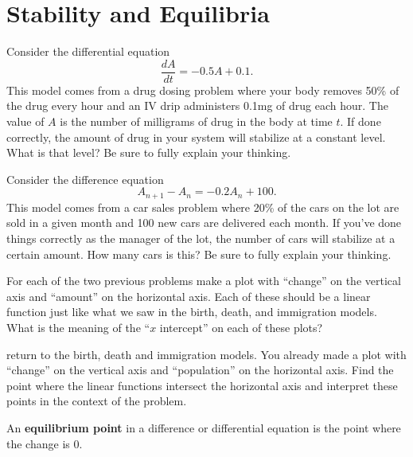\section{Stability and Equilibria}
\begin{problem}
    Consider the differential equation 
    \[ \frac{dA}{dt} = -0.5A + 0.1. \]
    This model comes from a drug dosing problem where your body removes 50\% of the drug
    every hour and an IV drip administers 0.1mg of drug each hour.  The value of $A$ is
    the number of milligrams of drug in the body at time $t$.  If done correctly, the
    amount of drug in your system will stabilize at a constant level.  What is that level?
    Be sure to fully explain your thinking.
\end{problem}

\begin{problem}
    Consider the difference equation
    \[ A_{n+1} - A_n = -0.2 A_n+ 100. \]
    This model comes from a car sales problem where 20\% of the cars on the lot are sold
    in a given month and 100 new cars are delivered each month.  If you've done things
    correctly as the manager of the lot, the number of cars will stabilize at a certain
    amount.  How many cars is this?  Be sure to fully explain your thinking.
\end{problem}

\begin{problem}
    For each of the two previous problems make a plot with ``change'' on the vertical axis
    and ``amount'' on the horizontal axis.  Each of these should be a linear function just
    like what we saw in the birth, death, and immigration models.  What is the meaning of
    the ``$x$ intercept'' on each of these plots?
\end{problem}

\begin{problem}
    return to the birth, death and immigration models.  You already made a plot with
    ``change'' on the vertical axis and ``population'' on the horizontal axis.  Find the
    point where the linear functions intersect the horizontal axis and interpret these
    points in the context of the problem.
\end{problem}

\begin{definition}
    An {\bf equilibrium point} in a difference or differential equation is the point where
    the change is 0.
\end{definition}

